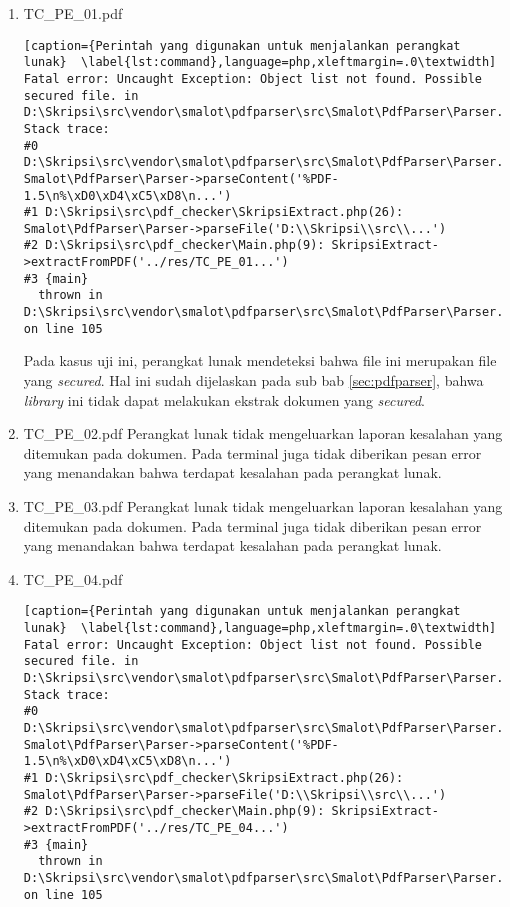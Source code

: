\begin{enumerate}
	\item TC\_PE\_01.pdf
	
\begin{lstlisting}[caption={Perintah yang digunakan untuk menjalankan perangkat lunak}	\label{lst:command},language=php,xleftmargin=.0\textwidth]
Fatal error: Uncaught Exception: Object list not found. Possible secured file. in D:\Skripsi\src\vendor\smalot\pdfparser\src\Smalot\PdfParser\Parser.php:105
Stack trace:
#0 D:\Skripsi\src\vendor\smalot\pdfparser\src\Smalot\PdfParser\Parser.php(81): Smalot\PdfParser\Parser->parseContent('%PDF-1.5\n%\xD0\xD4\xC5\xD8\n...')
#1 D:\Skripsi\src\pdf_checker\SkripsiExtract.php(26): Smalot\PdfParser\Parser->parseFile('D:\\Skripsi\\src\\...')
#2 D:\Skripsi\src\pdf_checker\Main.php(9): SkripsiExtract->extractFromPDF('../res/TC_PE_01...')
#3 {main}
  thrown in D:\Skripsi\src\vendor\smalot\pdfparser\src\Smalot\PdfParser\Parser.php on line 105
\end{lstlisting}

	Pada kasus uji ini, perangkat lunak mendeteksi bahwa file ini merupakan file yang \textit{secured}. Hal ini sudah dijelaskan pada sub bab \ref{sec:pdfparser}, bahwa \textit{library} ini tidak dapat melakukan ekstrak dokumen yang \textit{secured}.
	
	\item TC\_PE\_02.pdf \newline
	Perangkat lunak tidak mengeluarkan laporan kesalahan yang ditemukan pada dokumen. Pada terminal juga tidak diberikan pesan error yang menandakan bahwa terdapat kesalahan pada perangkat lunak.	
	
	\item TC\_PE\_03.pdf \newline
	Perangkat lunak tidak mengeluarkan laporan kesalahan yang ditemukan pada dokumen. Pada terminal juga tidak diberikan pesan error yang menandakan bahwa terdapat kesalahan pada perangkat lunak.	
	
	\item TC\_PE\_04.pdf

\begin{lstlisting}[caption={Perintah yang digunakan untuk menjalankan perangkat lunak}	\label{lst:command},language=php,xleftmargin=.0\textwidth]
Fatal error: Uncaught Exception: Object list not found. Possible secured file. in D:\Skripsi\src\vendor\smalot\pdfparser\src\Smalot\PdfParser\Parser.php:105
Stack trace:
#0 D:\Skripsi\src\vendor\smalot\pdfparser\src\Smalot\PdfParser\Parser.php(81): Smalot\PdfParser\Parser->parseContent('%PDF-1.5\n%\xD0\xD4\xC5\xD8\n...')
#1 D:\Skripsi\src\pdf_checker\SkripsiExtract.php(26): Smalot\PdfParser\Parser->parseFile('D:\\Skripsi\\src\\...')
#2 D:\Skripsi\src\pdf_checker\Main.php(9): SkripsiExtract->extractFromPDF('../res/TC_PE_04...')
#3 {main}
  thrown in D:\Skripsi\src\vendor\smalot\pdfparser\src\Smalot\PdfParser\Parser.php on line 105
\end{lstlisting}


\end{enumerate}
